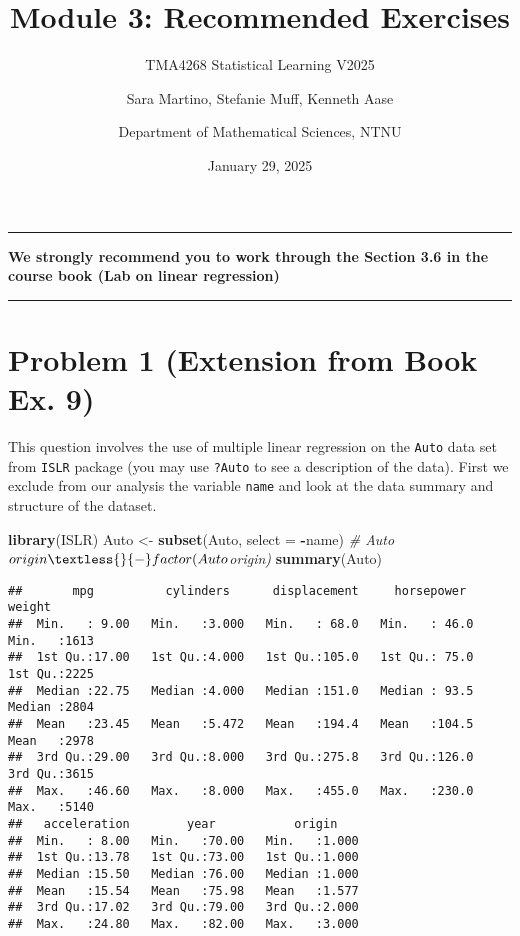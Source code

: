 \documentclass[
]{article}
\title{Module 3: Recommended Exercises}
\subtitle{TMA4268 Statistical Learning V2025}
\author{Sara Martino, Stefanie Muff, Kenneth Aase \and Department of
Mathematical Sciences, NTNU}
\date{January 29, 2025}
\newenvironment{Shaded}{\begin{snugshade}}{\end{snugshade}}
\newcommand{\AttributeTok}[1]{\textcolor[rgb]{0.13,0.29,0.53}{#1}}
\newcommand{\CommentTok}[1]{\textcolor[rgb]{0.56,0.35,0.01}{\textit{#1}}}
\newcommand{\FunctionTok}[1]{\textcolor[rgb]{0.13,0.29,0.53}{\textbf{#1}}}
\newcommand{\NormalTok}[1]{#1}
\newcommand{\OtherTok}[1]{\textcolor[rgb]{0.56,0.35,0.01}{#1}}
\newcommand{\SpecialCharTok}[1]{\textcolor[rgb]{0.81,0.36,0.00}{\textbf{#1}}}
\begin{document}
\maketitle

\begin{center}\rule{0.5\linewidth}{0.5pt}\end{center}

\textbf{We strongly recommend you to work through the Section 3.6 in the
course book (Lab on linear regression)}

\begin{center}\rule{0.5\linewidth}{0.5pt}\end{center}

\section{Problem 1 (Extension from Book Ex.
9)}\label{problem-1-extension-from-book-ex.-9}

This question involves the use of multiple linear regression on the
\texttt{Auto} data set from \texttt{ISLR} package (you may use
\texttt{?Auto} to see a description of the data). First we exclude from
our analysis the variable \texttt{name} and look at the data summary and
structure of the dataset.

\begin{Shaded}
\begin{Highlighting}[]
\FunctionTok{library}\NormalTok{(ISLR)}
\NormalTok{Auto }\OtherTok{\textless{}{-}} \FunctionTok{subset}\NormalTok{(Auto, }\AttributeTok{select =} \SpecialCharTok{{-}}\NormalTok{name)}
\CommentTok{\# Auto$origin \textless{}{-} factor(Auto$origin)}
\FunctionTok{summary}\NormalTok{(Auto)}
\end{Highlighting}
\end{Shaded}

\begin{verbatim}
##       mpg          cylinders      displacement     horsepower        weight    
##  Min.   : 9.00   Min.   :3.000   Min.   : 68.0   Min.   : 46.0   Min.   :1613  
##  1st Qu.:17.00   1st Qu.:4.000   1st Qu.:105.0   1st Qu.: 75.0   1st Qu.:2225  
##  Median :22.75   Median :4.000   Median :151.0   Median : 93.5   Median :2804  
##  Mean   :23.45   Mean   :5.472   Mean   :194.4   Mean   :104.5   Mean   :2978  
##  3rd Qu.:29.00   3rd Qu.:8.000   3rd Qu.:275.8   3rd Qu.:126.0   3rd Qu.:3615  
##  Max.   :46.60   Max.   :8.000   Max.   :455.0   Max.   :230.0   Max.   :5140  
##   acceleration        year           origin     
##  Min.   : 8.00   Min.   :70.00   Min.   :1.000  
##  1st Qu.:13.78   1st Qu.:73.00   1st Qu.:1.000  
##  Median :15.50   Median :76.00   Median :1.000  
##  Mean   :15.54   Mean   :75.98   Mean   :1.577  
##  3rd Qu.:17.02   3rd Qu.:79.00   3rd Qu.:2.000  
##  Max.   :24.80   Max.   :82.00   Max.   :3.000
\end{verbatim}
\end{document}
